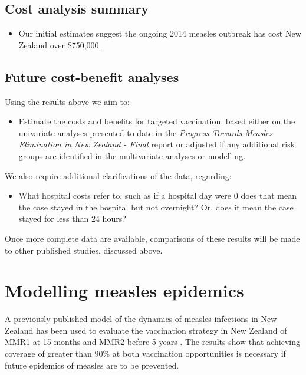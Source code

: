 \documentclass{article}
\begin{document}
{\subsection{Cost analysis summary}
\begin{itemize}
\item Our initial estimates suggest the ongoing 2014 measles outbreak has cost New Zealand over \$750,000.
\end{itemize}

\subsection{Future cost-benefit analyses}
Using the results above we aim to:
\begin{itemize}
\item Estimate the costs and benefits for targeted vaccination, based either on the univariate analyses presented to date in the \emph {Progress Towards Measles Elimination in New Zealand - Final} report or adjusted if any additional risk groups are identified in the multivariate analyses or modelling.
\end{itemize}

We also require additional clarifications of the data, regarding:
\begin {itemize}
\item What hospital costs refer to, such as if a hospital day were 0 does that mean the case stayed in the hospital but not overnight? Or, does it mean the case stayed for less than 24 hours?
\end {itemize}
Once more complete data are available, comparisons of these results will be made to other published studies, discussed above.

\section{Modelling measles epidemics}
\label{sec:epidemic_modelling}

A previously-published model of the dynamics of measles infections in New Zealand has been used to evaluate the vaccination strategy in New Zealand of MMR1 at 15 months and MMR2 before 5 years \citep{roberts0,roberts4,tobias98}. The results show that achieving coverage of greater than 90\% at both vaccination opportunities is necessary if future epidemics of measles are to be prevented.

}
\end{document}
